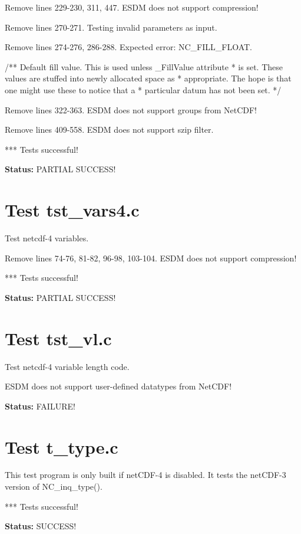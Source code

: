 Remove lines 229-230, 311, 447. ESDM does not support compression!

Remove lines 270-271. Testing invalid parameters as input.

Remove lines 274-276, 286-288. Expected error: NC\_FILL\_FLOAT.

/** Default fill value. This is used unless \_FillValue attribute
 * is set.  These values are stuffed into newly allocated space as
 * appropriate.  The hope is that one might use these to notice that a
 * particular datum has not been set. */

Remove lines 322-363. ESDM does not support groups from NetCDF!

Remove lines 409-558. ESDM does not support szip filter.

*** Tests successful!

{\bf \large Status: } PARTIAL SUCCESS!

\section{Test tst\_vars4.c}

Test netcdf-4 variables.

Remove lines 74-76, 81-82, 96-98, 103-104. ESDM does not support compression!

*** Tests successful!

{\bf \large Status: } PARTIAL SUCCESS!

\section{Test tst\_vl.c}

Test netcdf-4 variable length code.

ESDM does not support user-defined datatypes from NetCDF!

{\bf \large Status: } FAILURE!

\section{Test t\_type.c}

This test program is only built if netCDF-4 is disabled. It tests
   the netCDF-3 version of NC\_inq\_type().

*** Tests successful!

{\bf \large Status: } SUCCESS!
